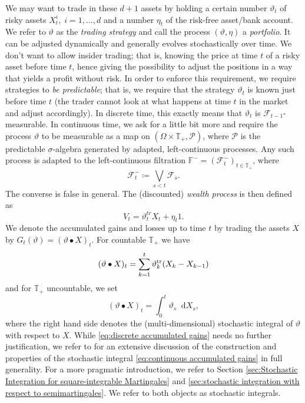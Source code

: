 \documentclass[11pt,a4paper,twoside,openany]{report}
\numberwithin{equation}{section}
\newcommand{\diff}{\mathop{}\!\mathrm{d}}
\theoremstyle{plain} %
\theoremstyle{definition} %
\theoremstyle{remark} %
\let\parencite\authnumparencite
\begin{document}
We may want to trade in these \(d+1\) assets by holding a certain number \(\vartheta_t\) of risky assets \(X_t^i,\;i=1,\dots,d\) and a number \(\eta_t\) of the risk-free asset/bank account. We refer to \(\vartheta\) as the \textit{trading strategy} and call the process \((\vartheta,\eta)\) a \textit{portfolio}. It can be adjusted dynamically and generally evolves stochastically over time. We don't want to allow insider trading; that is, knowing the price at time \(t\) of a risky asset before time \(t\), hence giving the possibility to adjust the positions in a way that yields a profit without risk. In order to enforce this requirement, we require strategies to \textit{be predictable}; that is, we require that the strategy \(\vartheta_t\) is known just before time \(t\) (the trader cannot look at what happens at time \(t\) in the market and adjust accordingly). In discrete time, this exactly means that \(\vartheta_t\) is \(\mathcal{F}_{t-1}\)-measurable. In continuous time, we ask for a little bit more and require the process \(\vartheta\) to be measurable as a map on \((\Omega\times\mathbb{T}_+,\mathcal{P})\), where \(\mathcal{P}\) is the predictable \(\sigma\)-algebra generated by adapted, left-continuous processes. Any such process is adapted to the left-continuous filtration \(\mathbb{F}^-=(\mathcal{F}^{-}_{t})_{t\in\mathbb{T}_+}\), where 
\begin{equation*}
    \mathcal{F}_t^{-}\coloneqq\bigvee_{s<t}\mathcal{F}_s.
\end{equation*}
The converse is false in general.
The (discounted) \textit{wealth process} is then defined as 
\begin{equation*}
    V_t = \vartheta_t^{tr} X_t+\eta_t1.
\end{equation*}
We denote the accumulated gains and losses up to time \(t\) by trading the assets \(X\) by \(G_t(\vartheta) = (\vartheta \bullet X)_t\). For countable  \(\mathbb{T}_+\) we have
\begin{equation}\label{eq:discrete accumulated gains}
    (\vartheta \bullet X)_t=\sum_{k=1}^{t}\vartheta_k^{\rm{tr}}(X_{k}-X_{k-1})
\end{equation}
and for \(\mathbb{T}_+\) uncountable, we set
\begin{equation}\label{eq:continuous accumulated gains}
    (\vartheta \bullet X)_t=\int_0^t\vartheta_s\diff X_s,
\end{equation} 
where the right hand side denotes the (multi-dimensional) stochastic integral of \(\vartheta\) with respect to \(X\). While \eqref{eq:discrete accumulated gains} needs no further justification, we refer to \parencite[Ch.II,Ch.IV]{Protter2005StochasticIntegration} for an extensive discussion of the construction and properties of the stochastic integral \eqref{eq:continuous accumulated gains} in full generality. For a more pragmatic introduction, we refer to Section \ref{sec:Stochastic Integration for square-integrable Martingales} and \ref{sec:stochastic integration with respect to semimartingales}. We refer to both objects as stochastic integrals. 
\end{document}
